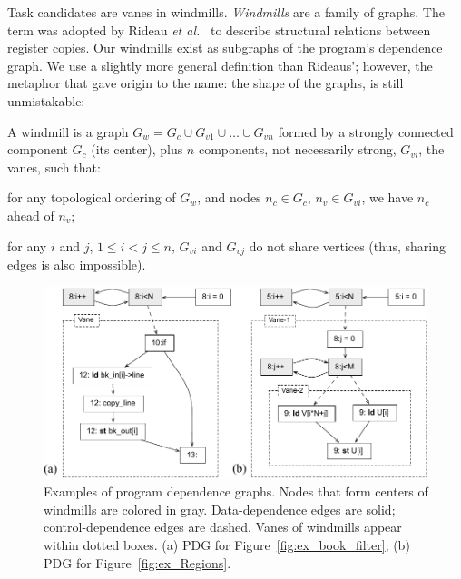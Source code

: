 \documentclass[sigplan,10pt,screen]{acmart}
\begin{document}
Task candidates are vanes in windmills.
{\em Windmills} are a family of graphs.
The term was adopted by Rideau
{\em et al.}~\cite{Rideau08} to describe structural relations between register
copies.
Our windmills exist as subgraphs of the program's dependence graph.
We use a slightly more general definition than Rideaus'; however, the
metaphor that gave origin to the name: the shape of the graphs, is still
unmistakable:

\begin{definition}
\label{def:windmill}
A windmill is a graph $G_w = G_c \cup G_{v1} \cup \ldots \cup G_{vn}$ formed by
a strongly connected component $G_c$ (its center), plus $n$ components, not
necessarily strong, $G_{vi}$, the vanes, such that:
\begin{compactenum}
\item for any topological ordering of $G_w$, and nodes $n_c \in G_c$,
$n_v \in G_{vi}$, we have $n_c$ ahead of $n_v$;
\item for any $i$ and $j$, $1 \leq i < j \leq n$, $G_{vi}$ and $G_{vj}$ do not
share vertices (thus, sharing edges is also impossible).
\end{compactenum}
\end{definition}


\begin{figure}[h]
\begin{center}
\includegraphics[width=1\columnwidth]{images/ex_windmill}
\caption{Examples of program dependence graphs.
Nodes that form centers of windmills are colored in gray.
Data-dependence edges are solid; control-dependence edges are dashed.
Vanes of windmills appear within dotted boxes.
(a) PDG for Figure~\ref{fig:ex_book_filter};
(b) PDG for Figure~\ref{fig:ex_Regions}.}
\label{fig:ex_windmill}
\end{center}
\end{figure}
\end{document}
